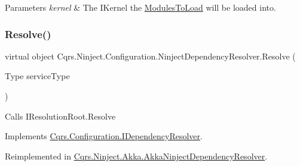 \begin{DoxyParams}{Parameters}
{\em kernel} & The I\+Kernel the \hyperlink{classCqrs_1_1Ninject_1_1Configuration_1_1NinjectDependencyResolver_a45264a8fae5380727d1af41bc2155381_a45264a8fae5380727d1af41bc2155381}{Modules\+To\+Load} will be loaded into.\\
\hline
\end{DoxyParams}
\mbox{\label{classCqrs_1_1Ninject_1_1Configuration_1_1NinjectDependencyResolver_aef2a2be58a2562a349572e9946cd2930_aef2a2be58a2562a349572e9946cd2930}} 
\subsubsection{\texorpdfstring{Resolve()}{Resolve()}}
{\footnotesize\ttfamily virtual object Cqrs.\+Ninject.\+Configuration.\+Ninject\+Dependency\+Resolver.\+Resolve (\begin{DoxyParamCaption}\item[{Type}]{service\+Type }\end{DoxyParamCaption})\hspace{0.3cm}{\ttfamily [virtual]}}



Calls I\+Resolution\+Root.\+Resolve 



Implements \hyperlink{interfaceCqrs_1_1Configuration_1_1IDependencyResolver_aa455096b7b94fc1d64904bc67830ec06_aa455096b7b94fc1d64904bc67830ec06}{Cqrs.\+Configuration.\+I\+Dependency\+Resolver}.



Reimplemented in \hyperlink{classCqrs_1_1Ninject_1_1Akka_1_1AkkaNinjectDependencyResolver_adace29de71f10e34e952bd41e48106a6_adace29de71f10e34e952bd41e48106a6}{Cqrs.\+Ninject.\+Akka.\+Akka\+Ninject\+Dependency\+Resolver}.

\mbox{\label{classCqrs_1_1Ninject_1_1Configuration_1_1NinjectDependencyResolver_a35cbb03e98326a3d10ba86c427148b3c_a35cbb03e98326a3d10ba86c427148b3c}} 
